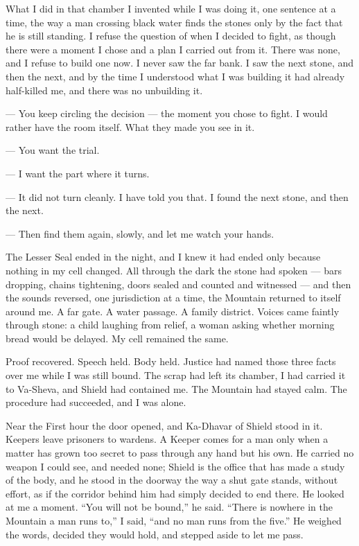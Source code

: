 
\ornament

What I did in that chamber I invented while I was doing it, one sentence at a time, the way a man crossing black water finds the stones only by the fact that he is still standing. I refuse the question of when I decided to fight, as though there were a moment I chose and a plan I carried out from it. There was none, and I refuse to build one now. I never saw the far bank. I saw the next stone, and then the next, and by the time I understood what I was building it had already half-killed me, and there was no unbuilding it.\par
 
\ornament
 
\begin{room}

--- You keep circling the decision --- the moment you chose to fight. I would rather have the room itself. What they made you see in it.

--- You want the trial.

--- I want the part where it turns.

--- It did not turn cleanly. I have told you that. I found the next stone, and then the next.

--- Then find them again, slowly, and let me watch your hands.

\end{room}
 
\ornament
 
The Lesser Seal ended in the night, and I knew it had ended only because nothing in my cell changed. All through the dark the stone had spoken --- bars dropping, chains tightening, doors sealed and counted and witnessed --- and then the sounds reversed, one jurisdiction at a time, the Mountain returned to itself around me. A far gate. A water passage. A family district. Voices came faintly through stone: a child laughing from relief, a woman asking whether morning bread would be delayed. My cell remained the same.\par
 
Proof recovered. Speech held. Body held. Justice had named those three facts over me while I was still bound. The scrap had left its chamber, I had carried it to Va-Sheva, and Shield had contained me. The Mountain had stayed calm. The procedure had succeeded, and I was alone.\par
 
Near the First hour the door opened, and Ka-Dhavar of Shield stood in it. Keepers leave prisoners to wardens. A Keeper comes for a man only when a matter has grown too secret to pass through any hand but his own. He carried no weapon I could see, and needed none; Shield is the office that has made a study of the body, and he stood in the doorway the way a shut gate stands, without effort, as if the corridor behind him had simply decided to end there. He looked at me a moment. ``You will not be bound,'' he said. ``There is nowhere in the Mountain a man runs to,'' I said, ``and no man runs from the five.'' He weighed the words, decided they would hold, and stepped aside to let me pass.\par
 
